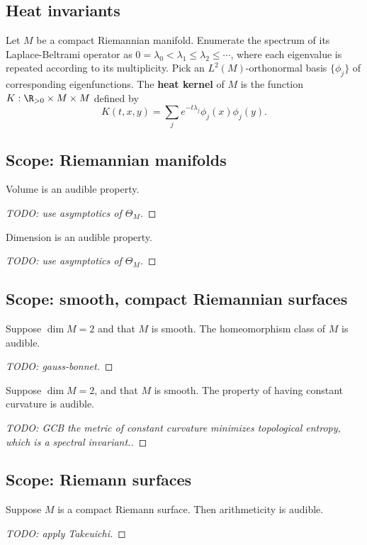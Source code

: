 \documentclass{amsart}
\begin{document}
\subsection{Heat invariants}
Let $M$ be a compact Riemannian manifold. Enumerate the spectrum of its Laplace-Beltrami operator as $0 = \lambda_0 < \lambda_1 \leq \lambda_2 \leq \cdots $, where each eigenvalue is repeated according to its multiplicity. Pick an $L^2(M)$-orthonormal basis $\{ \phi_j  \}$ of corresponding eigenfunctions.  The \textbf{heat kernel} of $M$ is the function $K : \R_{>0} \times M \times M$ defined by
\begin{equation}
	K(t,x,y) = \sum_{j} e^{-t \lambda_j} \phi_j(x)\phi_j(y).
\end{equation}



\subsection{Scope: Riemannian manifolds}
\begin{thm}
	Volume is an audible property.
\end{thm}
\begin{proof}
	[TODO: use asymptotics of $\Theta_M$]
\end{proof}
\begin{thm}
	Dimension is an audible property.
\end{thm}
\begin{proof}
	[TODO: use asymptotics of $\Theta_M$]
\end{proof}
\subsection{Scope: smooth, compact Riemannian surfaces}
\begin{thm}
	Suppose $\dim M = 2$ and that $M$ is smooth. The homeomorphism class of
	$M$ is audible.
\end{thm}
\begin{proof}
	[TODO: gauss-bonnet]
\end{proof}
\begin{thm}
	Suppose $\dim M = 2$, and that $M$ is smooth. The property of having constant
	curvature is audible.
\end{thm}
\begin{proof}
	[TODO: GCB the metric of constant curvature minimizes topological
		entropy, which is a spectral invariant.]
\end{proof}
\subsection{Scope: Riemann surfaces}
\begin{thm}
	Suppose $M$ is a compact Riemann surface. Then arithmeticity is audible.
\end{thm}
\begin{proof}
	[TODO: apply Takeuichi]
\end{proof}
\end{document}

